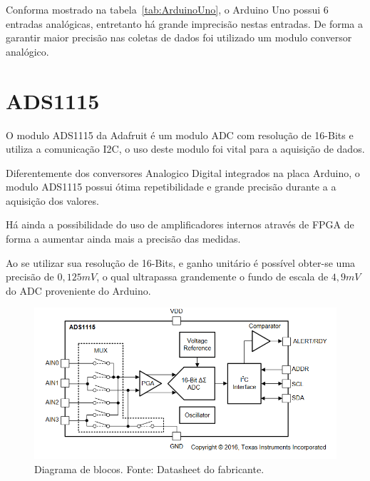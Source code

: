 Conforma mostrado na tabela~\ref{tab:ArduinoUno}, o Arduino Uno possui 6 entradas analógicas, entretanto há grande imprecisão nestas entradas. De forma a garantir maior precisão nas coletas de dados foi utilizado um modulo conversor analógico.

\section{ADS1115}
O modulo ADS1115 da Adafruit é um modulo ADC com resolução de 16-Bits e utiliza a comunicação I2C, o uso deste modulo foi vital para a aquisição de dados.

Diferentemente dos conversores Analogico Digital integrados na placa Arduino, o modulo ADS1115 possui ótima repetibilidade e grande precisão durante a a aquisição dos valores.

Há ainda a possibilidade do uso de amplificadores internos através de FPGA de forma a aumentar ainda mais a precisão das medidas.

Ao se utilizar sua resolução de 16-Bits, e ganho unitário é possível obter-se uma precisão de $0,125 mV$, o qual ultrapassa grandemente o fundo de escala de $4,9mV$ do ADC proveniente do Arduino.
\FloatBarrier
\begin{figure}[!htbp]
	\centering
	\includegraphics[scale=0.7]{imagens/ADS}
	\caption{Diagrama de blocos. Fonte: Datasheet do fabricante. }
	
	\label{fig:Ads}
\end{figure}
\FloatBarrier
